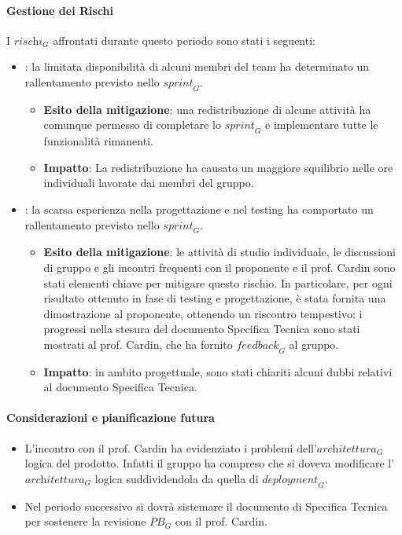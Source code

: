 \paragraph*{Gestione dei Rischi}
I $\textit{rischi}_G$ affrontati durante questo periodo sono stati i seguenti:
\begin{itemize}
\item {}: la limitata disponibilità di alcuni membri del team ha determinato un rallentamento previsto nello $\textit{sprint}_G$.
\begin{itemize}
\item \textbf{Esito della mitigazione}: una redistribuzione di alcune attività ha comunque permesso di completare lo $\textit{sprint}_G$ e implementare tutte le funzionalità rimanenti.
\item \textbf{Impatto}: La redistribuzione ha causato un maggiore squilibrio nelle ore individuali lavorate dai membri del gruppo.
\end{itemize}
\item {}: la scarsa esperienza nella progettazione e nel testing ha comportato un rallentamento previsto nello $\textit{sprint}_G$.
\begin{itemize}
\item \textbf{Esito della mitigazione}: le attività di studio individuale, le discussioni di gruppo e gli incontri frequenti con il proponente e il prof. Cardin sono stati elementi chiave per mitigare questo rischio. In particolare, per ogni risultato ottenuto in fase di testing e progettazione, è stata fornita una dimostrazione al proponente, ottenendo un riscontro tempestivo; i progressi nella stesura del documento Specifica Tecnica sono stati mostrati al prof. Cardin, che ha fornito $\textit{feedback}_G$ al gruppo.
\item \textbf{Impatto}: in ambito progettuale, sono stati chiariti alcuni dubbi relativi al documento Specifica Tecnica.
\end{itemize}
\end{itemize}
\paragraph*{Considerazioni e pianificazione futura}
\begin{itemize}
    \item L'incontro con il prof. Cardin ha evidenziato i problemi dell'$\textit{architettura}_G$ logica del prodotto. Infatti il gruppo ha compreso che si doveva modificare l'$\textit{architettura}_G$ logica suddividendola da quella di $\textit{deployment}_G$.
    \item Nel periodo successivo si dovrà sistemare il documento di Specifica Tecnica per sostenere la revisione $\textit{PB}_G$ con il prof. Cardin.
\end{itemize}
 